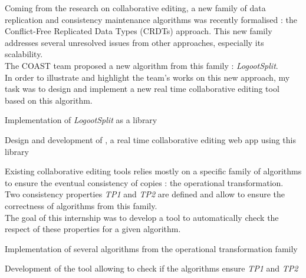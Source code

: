\hfill\begin{minipage}{\dimexpr\textwidth-0.5cm}
Coming from the research on collaborative editing, a new family of data replication and consistency maintenance algorithms
was recently formalised : the Conflict-Free Replicated Data Types (CRDTs) approach.
This new family addresses several unresolved issues from other approaches, especially its scalability.
\\
The COAST team proposed a new algorithm from this family : \emph{LogootSplit}.
\\
In order to illustrate and highlight the team's works on this new approach,
my task was to design and implement a new real time collaborative editing tool based on this algorithm.
\begin{tightemize}
\item Implementation of \emph{LogootSplit} as a library
\item Design and development of \href{https://www.coedit.re}{}, a real time collaborative editing web app using this library
\end{tightemize}
\sectionsep\xdef\tpd{\the\prevdepth}
\end{minipage}

\sectionsep

\hfill\begin{minipage}{\dimexpr\textwidth-0.5cm}
Existing collaborative editing tools relies mostly on a specific family of algorithms
to ensure the eventual consistency of copies : the operational transformation.
\\
Two consistency properties \emph{TP1} and \emph{TP2} are defined and allow to ensure the correctness of algorithms from this family.
\\
The goal of this internship was to develop a tool to automatically check the respect of these properties for a given algorithm.
\begin{tightemize}
\item Implementation of several algorithms from the operational transformation family
\item Development of the tool allowing to check if the algorithms ensure \emph{TP1} and \emph{TP2}
\end{tightemize}
\sectionsep\xdef\tpd{\the\prevdepth}
\end{minipage}

